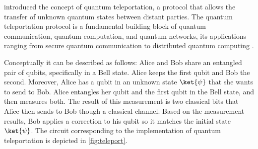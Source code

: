 \begin{example} \label{ex:quantum_teleportation_syntax}
\cite{bennett1993teleporting} introduced the concept of quantum teleportation,
a protocol that allows the transfer of  unknown quantum states between distant
parties.  The quantum teleportation protocol is a fundamental building block of
quantum communication, quantum computation, and quantum networks, its
applications ranging from secure quantum communication to distributed quantum
computing
\cite{briegel1998quantum,gottesman1999demonstrating,kimble2008quantum}.

Conceptually it can be described as follows: Alice and Bob share an entangled
pair of qubits, specifically in a Bell state. Alice keeps the first qubit and
Bob the second. Moreover, Alice has a qubit in an unknown state $\ket{\psi}$
that she wants to send to Bob.  Alice entangles her qubit and the first qubit
in the Bell state, and then measures both. The result of this measurement is
two classical bits that Alice then sends to Bob though a classical channel.
Based on the measurement results, Bob applies a correction to his qubit so it
matches the initial state $\ket{\psi}$.  The circuit corresponding to the
implementation of quantum teleportation is depicted in \autoref{fig:teleport}.



\end{example}
